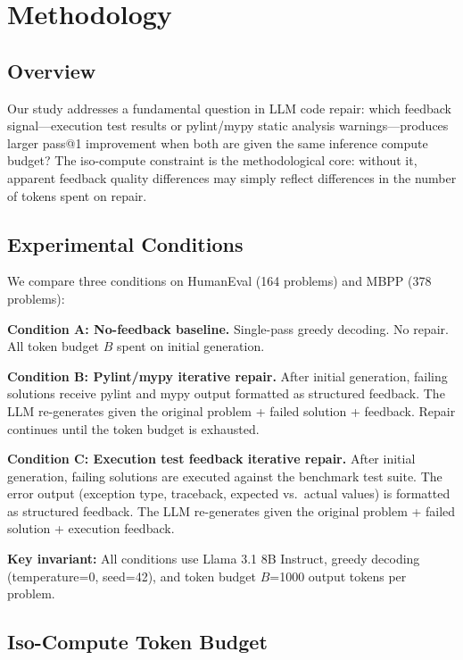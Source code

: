 \section{Methodology}
\label{sec:methodology}

\subsection{Overview}

Our study addresses a fundamental question in LLM code repair: which feedback signal---execution test results or pylint/mypy static analysis warnings---produces larger pass@1 improvement when both are given the same inference compute budget? The iso-compute constraint is the methodological core: without it, apparent feedback quality differences may simply reflect differences in the number of tokens spent on repair.

\subsection{Experimental Conditions}

We compare three conditions on HumanEval (164 problems) and MBPP (378 problems):

\textbf{Condition A: No-feedback baseline.} Single-pass greedy decoding. No repair. All token budget $B$ spent on initial generation.

\textbf{Condition B: Pylint/mypy iterative repair.} After initial generation, failing solutions receive pylint and mypy output formatted as structured feedback. The LLM re-generates given the original problem + failed solution + feedback. Repair continues until the token budget is exhausted.

\textbf{Condition C: Execution test feedback iterative repair.} After initial generation, failing solutions are executed against the benchmark test suite. The error output (exception type, traceback, expected vs.\ actual values) is formatted as structured feedback. The LLM re-generates given the original problem + failed solution + execution feedback.

\textbf{Key invariant:} All conditions use Llama 3.1 8B Instruct, greedy decoding (temperature=0, seed=42), and token budget $B$=1000 output tokens per problem.

\subsection{Iso-Compute Token Budget}


